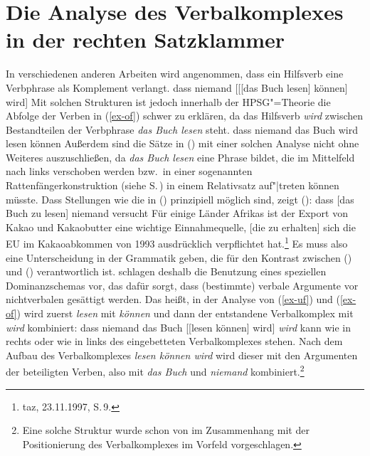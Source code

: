 \section{Die Analyse des Verbalkomplexes in der rechten Satzklammer}
\label{sec-verbalkomplex}

In verschiedenen anderen Arbeiten \citep[z.\,B.][Kapitel~3]{Uszkoreit87a} 
wird angenommen, dass ein Hilfsverb eine Verbphrase als Komplement verlangt. 
\ea
\label{ex-uf}
dass niemand [[[das Buch lesen] können] wird]
\z
Mit solchen Strukturen ist jedoch innerhalb der HPSG"=Theorie
die Abfolge der Verben in (\ref{ex-of}) schwer zu erklären,
da das Hilfsverb \emph{wird} zwischen Bestandteilen der Verbphrase \emph{das Buch lesen} steht.
\ea
\label{ex-of}
dass niemand das Buch wird lesen können
\z
Außerdem sind die Sätze in () mit einer solchen Analyse nicht ohne Weiteres auszuschließen,
da \emph{das Buch lesen} eine Phrase bildet, die im Mittelfeld nach links verschoben
werden bzw.\ in einer sogenannten Rattenfängerkonstruktion (siehe S.\,\pageref{page-rattenfaenger})
in einem Relativsatz auf"|treten können müsste.
\eal
{}
\zl
Dass Stellungen wie die in () prinzipiell möglich sind, zeigt ():
\eal
\ex dass [das Buch zu lesen] niemand versucht
\ex Für einige Länder Afrikas ist der Export von Kakao und Kakaobutter eine wichtige
    Einnahmequelle, [die zu erhalten] sich die EU im Kakaoabkommen von 1993 ausdrücklich
    verpflichtet hat.\footnote{
        taz, 23.11.1997, S.\,9.
}
\zl
Es muss also eine Unterscheidung in der Grammatik geben, die für den Kontrast
zwischen () und () verantwortlich ist.
\citet*{HN94a} 
schlagen deshalb die Benutzung eines speziellen Dominanzschemas vor, 
das dafür sorgt, dass (bestimmte) verbale Argumente vor nichtverbalen gesättigt werden. Das heißt,
in der Analyse von (\ref{ex-uf}) und (\ref{ex-of}) wird zuerst \emph{lesen} mit \emph{können}
und dann der entstandene Verbalkomplex mit \emph{wird} kombiniert:
\ea
\label{ex-struktur-lesen-koennen-wird}
dass niemand das Buch [[lesen können] wird]
\z
\emph{wird} kann wie in  rechts oder wie in  links des eingebetteten Verbalkomplexes
stehen. Nach dem Aufbau des Verbalkomplexes \emph{lesen können wird} wird dieser mit den Argumenten 
der beteiligten Verben, also mit \emph{das Buch} und \emph{niemand} kombiniert.\footnote{
        Eine solche Struktur wurde schon von \citet*{Johnson86a}
        im Zusammenhang mit der Positionierung des Verbalkomplexes im
        Vorfeld vorgeschlagen.
}

